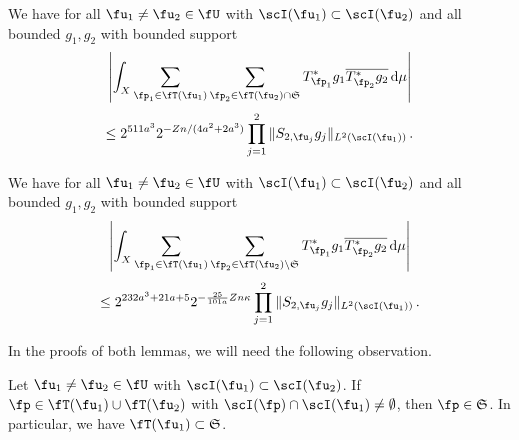 \begin{lemma}
        \label{correlation-distant-tree-parts}
        \leanok
        We have for all $\fu_1 \ne \fu_2 \in \fU$ with $\scI(\fu_1) \subset \scI(\fu_2)$ and all bounded $g_1, g_2$ with bounded support
      \begin{equation}
            \label{eq-lhs-big-sep-tree}
            \left| \int_X \sum_{\fp_1 \in \fT(\fu_1)} \sum_{\fp_2 \in \fT(\fu_2) \cap \mathfrak{S}} T^*_{\fp_1}g_1 \overline{T^*_{\fp_2}g_2 }\,\mathrm{d}\mu \right|
        \end{equation}
      \begin{equation}
            \label{eq-rhs-big-sep-tree}
            \le 2^{511a^3} 2^{-Zn/(4a^2 + 2a^3)} \prod_{j =1}^2 \| S_{2, \fu_j} g_j\|_{L^2(\scI(\fu_1))}\,.
        \end{equation}
    \end{lemma}
    \begin{lemma}
        \label{correlation-near-tree-parts}
        \leanok
        We have for all $\fu_1 \ne \fu_2 \in \fU$ with $\scI(\fu_1) \subset \scI(\fu_2)$ and all bounded $g_1, g_2$ with bounded support
      \begin{equation}
            \label{eq-lhs-small-sep-tree}
            \left| \int_X \sum_{\fp_1 \in \fT(\fu_1)} \sum_{\fp_2 \in \fT(\fu_2) \setminus \mathfrak{S}} T^*_{\fp_1}g_1 \overline{T^*_{\fp_2}g_2 }\,\mathrm{d}\mu \right|
        \end{equation}
      \begin{equation}
            \label{eq-rhs-small-sep-tree}
            \le 2^{232a^3+21a+5} 2^{-\frac{25}{101a}Zn\kappa} \prod_{j=1}^2 \|S_{2, \fu_j} g_j\|_{L^2(\scI(\fu_1))}\,.
        \end{equation}
    \end{lemma}

In the proofs of both lemmas, we will need the following observation.

\begin{lemma}
    \label{overlap-implies-distance}
    \leanok
    Let $\fu_1 \ne \fu_2 \in \fU$ with $\scI(\fu_1) \subset \scI(\fu_2)$. If $\fp \in \fT(\fu_1) \cup \fT(\fu_2)$ with $\scI(\fp) \cap \scI(\fu_1) \ne \emptyset$, then $\fp \in \mathfrak{S}$. In particular, we have $\fT(\fu_1) \subset \mathfrak{S}$.
\end{lemma}

